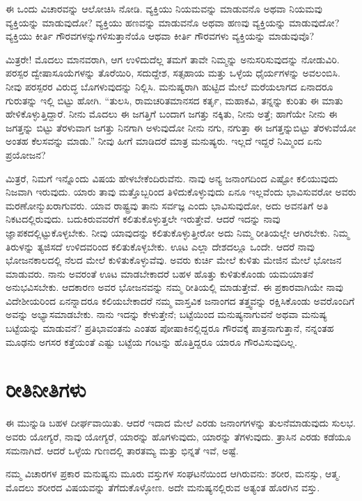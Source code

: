 ಈ ಒಂದು ವಿಚಾರವನ್ನು ಆಲೋಚಿಸಿ ನೋಡಿ. ವ್ಯಕ್ತಿಯು ನಿಯಮವನ್ನು ಮಾಡುವನೊ ಅಥವಾ ನಿಯಮವು ವ್ಯಕ್ತಿಯನ್ನು ಮಾಡುವುದೋ? ವ್ಯಕ್ತಿಯು ಹಣವನ್ನು ಮಾಡುವನೊ ಅಥವಾ ಹಣವು ವ್ಯಕ್ತಿಯನ್ನು ಮಾಡುವುದೋ? ವ್ಯಕ್ತಿಯು ಕೀರ್ತಿ ಗೌರವಗಳನ್ನು\-ಗಳಿಸುತ್ತಾನೆಯೊ ಆಥವಾ ಕೀರ್ತಿ ಗೌರವಗಳು ವ್ಯಕ್ತಿಯನ್ನು ಮಾಡುವುವೊ?

ಮಿತ್ರರೇ! ಮೊದಲು ಮಾನವರಾಗಿ, ಆಗ ಉಳಿದುದೆಲ್ಲ ತಮಗೆ ತಾವೇ ನಿಮ್ಮನ್ನು ಅನುಸರಿಸುವುದನ್ನು ನೋಡುವಿರಿ. ಪರಸ್ಪರ ದ್ವೇಷಾಸೂಯೆಗಳನ್ನು ತೊರೆಯಿರಿ, ಸದುದ್ದೇಶ, ಸತ್ಸಹಾಯ ಮತ್ತು ಒಳ್ಳೆಯ ಧೈರ್ಯಗಳನ್ನು ಅವಲಂಬಿಸಿ. ನೀವು ಪರಸ್ಪರರ ವಿರುದ್ಧ ಬೊಗಳುವುದನ್ನು ನಿಲ್ಲಿಸಿ. ಮನುಷ್ಯರಾಗಿ ಹುಟ್ಟಿದ ಮೇಲೆ ಮರೆಯಲಾಗದ ಏನಾದರೂ ಗುರುತನ್ನು ಇಲ್ಲಿ ಬಿಟ್ಟು ಹೋಗಿ. “ತುಲಸಿ, ರಾಮಚರಿತಮಾನಸದ ಕರ್ತೃ, ಮಹಾಕವಿ, ತನ್ನನ್ನು ಕುರಿತು ಈ ಮಾತು ಹೇಳಿಕೊಳ್ಳುತ್ತಿದ್ದಾರೆ. ನೀನು ಮೊದಲು ಈ ಜಗತ್ತಿಗೆ ಬಂದಾಗ ಜಗತ್ತು ನಕ್ಕಿತು, ನೀನು ಅತ್ತೆ; ಹಾಗೆಯೇ ನೀನು ಈ ಜಗತ್ತನ್ನು ಬಿಟ್ಟು ತೆರಳುವಾಗ ಜಗತ್ತು ನಿನಗಾಗಿ ಅಳುವುದೋ ನೀನು ನಗು, ನಗುತ್ತಾ ಈ ಜಗತ್ತನ್ನುಬಿಟ್ಟು ತೆರಳುವೆಯೋ ಅಂತಹ ಕೆಲಸವನ್ನು ಮಾಡು.” ನೀವು ಹೀಗೆ ಮಾಡಿದರೆ ಮಾತ್ರ ಮನುಷ್ಯರು. ಇಲ್ಲದೆ ಇದ್ದರೆ ನಿಮ್ಮಿಂದ ಏನು ಪ್ರಯೋಜನ?

ಮಿತ್ರರೆ, ನಿಮಗೆ ಇನ್ನೊಂದು ವಿಷಯ ಹೇಳಬೇಕೆಂದಿರುವೆನು. ನಾವು ಅನ್ಯ ಜನಾಂಗದಿಂದ ಎಷ್ಟೋ ಕಲಿಯುವುದು ನಿಜವಾಗಿ ಇರುವುದು. ಯಾರು ತಾವು ಮತ್ತೊಬ್ಬರಿಂದ ತಿಳಿದುಕೊಳ್ಳುವುದು ಏನೂ ಇಲ್ಲವೆಂದು ಭಾವಿಸುವರೋ ಅವರು ಮರಣೋನ್ಮುಖರಾಗು\-ವರು. ಯಾವ ರಾಷ್ಟ್ರವು ತಾನು ಸರ್ವಜ್ಞ ಎಂದು ಭಾವಿಸುವುದೋ, ಅದು ಅವನತಿಗೆ ಅತಿ ನಿಕಟದಲ್ಲಿರುವುದು. ಬದುಕಿರುವವರೆಗೆ ಕಲಿತುಕೊಳ್ಳುತ್ತಲೇ ಇರುತ್ತೇವೆ. ಆದರೆ ಇದನ್ನು ನಾವು ಜ್ಞಾಪಕದಲ್ಲಿಟ್ಟುಕೊಳ್ಳಬೇಕು. ನೀವು ಯಾವುದನ್ನು ಕಲಿತುಕೊಳ್ಳುತ್ತೀರೋ ಅದು ನಿಮ್ಮ ರೀತಿಯಲ್ಲೇ ಆಗಿರಬೇಕು. ನಿಮ್ಮ ತಿರುಳನ್ನು ತ್ಯಜಿಸದೆ ಉಳಿದವರಿಂದ ಕಲಿತುಕೊಳ್ಳಬೇಕು. ಊಟ ಎಲ್ಲಾ ದೇಶದಲ್ಲೂ ಒಂದೇ. ಆದರೆ ನಾವು ಭೋಜನಕಾಲದಲ್ಲಿ ನೆಲದ ಮೇಲೆ ಕುಳಿತುಕೊಳ್ಳುವೆವು. ಅವರು ಕುರ್ಚಿ ಮೇಲೆ ಕುಳಿತು ಮೇಜಿನ ಮೇಲೆ ಭೋಜನ ಮಾಡುವರು. ನಾನು ಅವರಂತೆ ಊಟ ಮಾಡಬೇಕಾದರೆ ಬಹಳ ಹೊತ್ತು ಕುಳಿತುಕೊಂಡು ಯಮಯಾತನೆ ಅನುಭವಿಸಬೇಕು. ಆದಕಾರಣ ಅವರ ಭೋಜನವನ್ನು ನಮ್ಮ ರೀತಿಯಲ್ಲಿ ಮಾಡುತ್ತೇವೆ. ಈ ಪ್ರಕಾರವಾಗಿಯೇ ನಾವು ವಿದೇಶೀಯರಿಂದ ಏನನ್ನಾದರೂ ಕಲಿಯಬೇಕಾದರೆ ನಮ್ಮ ವಾಸ್ತವಿಕ ಜನಾಂಗದ ತತ್ತ್ವವನ್ನು ರಕ್ಷಿಸಿಕೊಂಡು ಅವರೊಂದಿಗೆ ಅವನ್ನು ಅಭ್ಯಾಸಮಾಡಬೇಕು. ನಾನು ಇದನ್ನು ಕೇಳುತ್ತೇನೆ; ಬಟ್ಟೆಯಿಂದ ಮನುಷ್ಯನಾಗುವನೆ ಅಥವಾ ಮನುಷ್ಯ ಬಟ್ಟೆಯನ್ನು ಮಾಡುವನೆ? ಪ್ರತಿಭಾವಂತನು ಎಂತಹ ಪೋಷಾಕಿನಲ್ಲಿದ್ದರೂ ಗೌರವಕ್ಕೆ ಪಾತ್ರನಾಗುತ್ತಾನೆ, ನನ್ನಂತಹ ಮೂಢನು ಅಗಸರ ಕತ್ತೆಯಂತೆ ಎಷ್ಟು ಬಟ್ಟೆಯ ಗಂಟನ್ನು ಹೊತ್ತಿದ್ದರೂ ಯಾರೂ ಗೌರವಿಸುವುದಿಲ್ಲ.

\newpage

\section*{ರೀತಿನೀತಿಗಳು}

ಈ ಮುನ್ನುಡಿ ಬಹಳ ದೀರ್ಘವಾಯಿತು. ಆದರೆ ಇದಾದ ಮೇಲೆ ಎರಡು ಜನಾಂಗಗಳನ್ನು ತುಲನೆಮಾಡುವುದು ಸುಲಭ. ಅವರು ಯೋಗ್ಯರೆ, ನಾವು ಯೋಗ್ಯರೆ, ಯಾರನ್ನು ಹೊಗಳುವುದು, ಯಾರನ್ನು ತೆಗಳುವುದು. ತ್ರಾಸಿನ ಎರಡು ಕಡೆಯೂ ಸಮನಾಗಿದೆ. ಆದರೆ ಒಳ್ಳೆಯ ಗುಣದಲ್ಲಿ ತಾರತಮ್ಯ ಮತ್ತು ಭಿನ್ನತೆ ಇವೆ, ಅಷ್ಟೆ.

ನಮ್ಮ ವಿಚಾರಗಳ ಪ್ರಕಾರ ಮನುಷ್ಯನು ಮೂರು ವಸ್ತುಗಳ ಸಂಘಟನೆಯಿಂದ ಆಗಿರುವನು: ಶರೀರ, ಮನಸ್ಸು, ಆತ್ಮ. ಮೊದಲು ಶರೀರದ ವಿಷಯವನ್ನು ತೆಗೆದುಕೊಳ್ಳೋಣ. ಅದೇ ಮನುಷ್ಯನಲ್ಲಿರುವ ಅತ್ಯಂತ ಹೊರಗಿನ ವಸ್ತು.

